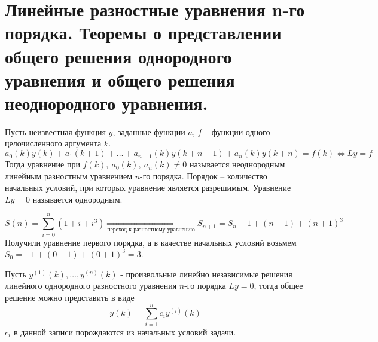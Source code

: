 \section{Линейные разностные уравнения n-го порядка.
  Теоремы о представлении общего решения однородного уравнения
  и общего решения неоднородного уравнения.
 }

\begin{definition}
  Пусть неизвестная функция $y$, заданные функции $a$, $f$
  -- функции одного целочисленного аргумента $k$.
  \[ a_0(k)y(k)+a_1(k+1)+\ldots+a_{n-1}(k)y(k+n-1)+a_n(k)y(k+n)=f(k) \Leftrightarrow Ly=f \]
  Тогда уравнение при $f(k),\ a_0(k),\ a_n(k) \neq 0$ называется
  неоднородным линейным разностным уравнением $n$-го порядка.
  Порядок -- количество начальных условий, при которых уравнение
  является разрешимым. Уравнение $Ly = 0$ называется однородным.
\end{definition}
\begin{example}
  \[S(n)=\sum_{i=0}^{n}(1+i+i^3)\underset{\text{переход к разностному уравнению}}{\Rightarrow}S_{n+1}=S_n+1+(n+1)+(n+1)^3\]
  Получили уравнение первого порядка, а в качестве начальных условий возьмем $S_0=+1+(0+1)+(0+1)^3=3$.
\end{example}
\begin{theorem}
  Пусть $y^{(1)}(k),\ldots,y^{(n)}(k)$ - произвольные линейно независимые
  решения линейного однородного разностного уравнения $n$-го порядка
  $Ly=0$, тогда общее решение можно представить в виде
  \[y(k)=\sum_{i=1}^{n}c_iy^{(i)}(k)\]
  $c_i$ в данной записи порождаются из начальных условий задачи.
\end{theorem}
